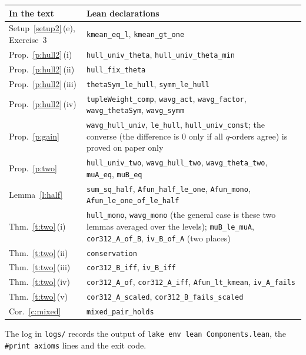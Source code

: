 \documentclass[11pt,a4paper]{article}
\newcommand{\lean}[1]{\texttt{#1}}
\theoremstyle{plain}
\theoremstyle{definition}
\theoremstyle{remark}
\begin{document}
\begin{center}\small
\begin{tabularx}{\linewidth}{@{}>{\raggedright\arraybackslash}p{3.4cm}>{\raggedright\arraybackslash}X@{}}
\toprule
In the text & Lean declarations\\
\midrule
Setup~\ref{setup2}\,(e), Exercise~3 & \lean{kmean\_eq\_l}, \lean{kmean\_gt\_one}\\
Prop.~\ref{p:hull2}\,(i) & \lean{hull\_univ\_theta}, \lean{hull\_univ\_theta\_min}\\
Prop.~\ref{p:hull2}\,(ii) & \lean{hull\_fix\_theta}\\
Prop.~\ref{p:hull2}\,(iii) & \lean{thetaSym\_le\_hull}, \lean{symm\_le\_hull}\\
Prop.~\ref{p:hull2}\,(iv) & \lean{tupleWeight\_comp}, \lean{wavg\_act}, \lean{wavg\_factor}, \lean{wavg\_thetaSym},
\lean{wavg\_symm}\\
Prop.~\ref{p:gain} & \lean{wavg\_hull\_univ}, \lean{le\_hull}, \lean{hull\_univ\_const}; the converse (the difference is
$0$ only if all $q$-orders agree) is proved on paper only\\
Prop.~\ref{p:two} & \lean{hull\_univ\_two}, \lean{wavg\_hull\_two}, \lean{wavg\_theta\_two}, \lean{muA\_eq},
\lean{muB\_eq}\\
Lemma~\ref{l:half} & \lean{sum\_sq\_half}, \lean{Afun\_half\_le\_one}, \lean{Afun\_mono},
\lean{Afun\_le\_one\_of\_le\_half}\\
Thm.~\ref{t:two}\,(i) & \lean{hull\_mono}, \lean{wavg\_mono} (the general case is these two lemmas averaged over the
levels); \lean{muB\_le\_muA}, \lean{cor312\_A\_of\_B}, \lean{iv\_B\_of\_A} (two places)\\
Thm.~\ref{t:two}\,(ii) & \lean{conservation}\\
Thm.~\ref{t:two}\,(iii) & \lean{cor312\_B\_iff}, \lean{iv\_B\_iff}\\
Thm.~\ref{t:two}\,(iv) & \lean{cor312\_A\_of}, \lean{cor312\_A\_iff}, \lean{Afun\_lt\_kmean}, \lean{iv\_A\_fails}\\
Thm.~\ref{t:two}\,(v) & \lean{cor312\_A\_scaled}, \lean{cor312\_B\_fails\_scaled}\\
Cor.~\ref{c:mixed} & \lean{mixed\_pair\_holds}\\
\bottomrule
\end{tabularx}
\end{center}
The log in \texttt{logs/} records the output of \texttt{lake env lean Components.lean}, the \texttt{\#print axioms}
lines and the exit code.
\end{document}
